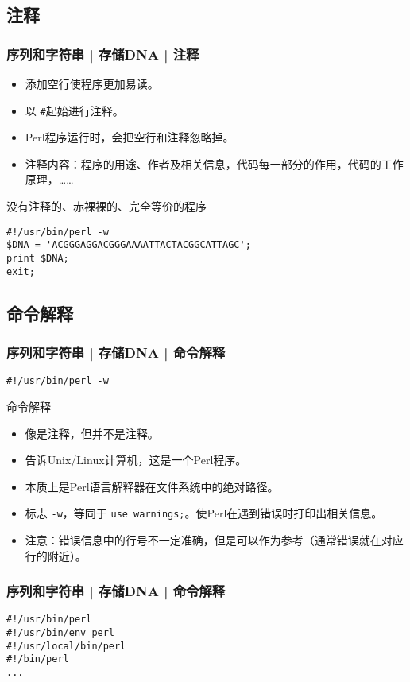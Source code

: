 \subsection{注释}
\begin{frame}[fragile]
  \frametitle{序列和字符串 | 存储DNA | 注释}
  \begin{itemize}
    \item 添加空行使程序更加易读。
    \item 以 \verb|#|起始进行注释。
    \item Perl程序运行时，会把空行和注释忽略掉。
    \item 注释内容：程序的用途、作者及相关信息，代码每一部分的作用，代码的工作原理，……
  \end{itemize}
  \pause
  \begin{block}{没有注释的、赤裸裸的、完全等价的程序}
\begin{lstlisting}
#!/usr/bin/perl -w
$DNA = 'ACGGGAGGACGGGAAAATTACTACGGCATTAGC';
print $DNA;
exit;
\end{lstlisting}
  \end{block}
\end{frame}

\subsection{命令解释}
\begin{frame}[fragile]
  \frametitle{序列和字符串 | 存储DNA | \alert{命令解释}}
\begin{lstlisting}
#!/usr/bin/perl -w
\end{lstlisting}
\pause
\begin{block}{命令解释}
  \begin{itemize}
    \item 像是注释，但并不是注释。
    \item 告诉Unix/Linux计算机，这是一个Perl程序。
    \item 本质上是Perl语言解释器在文件系统中的绝对路径。
    \item 标志 \verb|-w|，等同于 \verb|use warnings;|。使Perl在遇到错误时打印出相关信息。
    \item 注意：错误信息中的行号不一定准确，但是可以作为参考（通常错误就在对应行的附近）。
  \end{itemize}
\end{block}
\end{frame}

\begin{frame}[fragile]
  \frametitle{序列和字符串 | 存储DNA | 命令解释}
\begin{lstlisting}
#!/usr/bin/perl
#!/usr/bin/env perl
#!/usr/local/bin/perl
#!/bin/perl
...
\end{lstlisting}
\end{frame}

